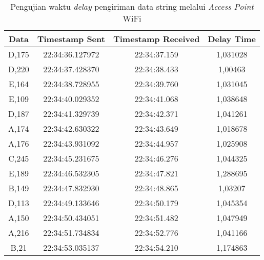 \begin{table}[H]
\centering
  \caption{Pengujian waktu \emph{delay} pengiriman data string melalui \emph{Access Point} WiFi}
  \label{tbl:delayWiFi}
  \begin{tabular}{|ccc|c|}
    \hline
    \multicolumn{1}{|c|}{Data}  & \multicolumn{1}{c|}{Timestamp Sent}  & Timestamp Received & Delay Time  \\ \hline
    \multicolumn{1}{|c|}{D,175} & \multicolumn{1}{c|}{22:34:36.127972} & 22:34:37.159       & 1,031028    \\ \hline
    \multicolumn{1}{|c|}{D,220} & \multicolumn{1}{c|}{22:34:37.428370} & 22:34:38.433       & 1,00463     \\ \hline
    \multicolumn{1}{|c|}{E,164} & \multicolumn{1}{c|}{22:34:38.728955} & 22:34:39.760       & 1,031045    \\ \hline
    \multicolumn{1}{|c|}{E,109} & \multicolumn{1}{c|}{22:34:40.029352} & 22:34:41.068       & 1,038648    \\ \hline
    \multicolumn{1}{|c|}{D,187} & \multicolumn{1}{c|}{22:34:41.329739} & 22:34:42.371       & 1,041261    \\ \hline
    \multicolumn{1}{|c|}{A,174} & \multicolumn{1}{c|}{22:34:42.630322} & 22:34:43.649       & 1,018678    \\ \hline
    \multicolumn{1}{|c|}{A,176} & \multicolumn{1}{c|}{22:34:43.931092} & 22:34:44.957       & 1,025908    \\ \hline
    \multicolumn{1}{|c|}{C,245} & \multicolumn{1}{c|}{22:34:45.231675} & 22:34:46.276       & 1,044325    \\ \hline
    \multicolumn{1}{|c|}{E,189} & \multicolumn{1}{c|}{22:34:46.532305} & 22:34:47.821       & 1,288695    \\ \hline
    \multicolumn{1}{|c|}{B,149} & \multicolumn{1}{c|}{22:34:47.832930} & 22:34:48.865       & 1,03207     \\ \hline
    \multicolumn{1}{|c|}{D,113} & \multicolumn{1}{c|}{22:34:49.133646} & 22:34:50.179       & 1,045354    \\ \hline
    \multicolumn{1}{|c|}{A,150} & \multicolumn{1}{c|}{22:34:50.434051} & 22:34:51.482       & 1,047949    \\ \hline
    \multicolumn{1}{|c|}{A,216} & \multicolumn{1}{c|}{22:34:51.734834} & 22:34:52.776       & 1,041166    \\ \hline
    \multicolumn{1}{|c|}{B,21}  & \multicolumn{1}{c|}{22:34:53.035137} & 22:34:54.210       & 1,174863    \\ \hline

\end{tabular}
\end{table}
